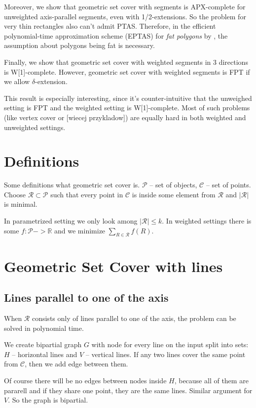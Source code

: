 \documentclass[en]{pracamgr}
\newcommand{\points}{\mathcal{C}}
\newcommand{\sets}{\mathcal{P}}
\newcommand{\sol}{\mathcal{R}}
\begin{document}
Moreover, we show that geometric set cover with segments
is APX-complete for unweighted axis-parallel segments,
even with 1/2-extensions.
So the problem for very thin rectangles
also can't admit PTAS.
Therefore, in the efficient polynomial-time approximation scheme (EPTAS)
for \textit{fat polygons} by \cite{harpeled12},
the assumption about polygons being fat is necessary. 

Finally, we show that geometric set cover with weighted segments in
3 directions is W[1]-complete.
However, geometric set cover with weighted segments is FPT if we allow
$\delta$-extension.

This result is especially interesting,
since it's counter-intuitive that
the unweighed setting is FPT and the weighted
setting is W[1]-complete.
Most of such problems (like vertex cover or [wiecej przykladow])
are equally hard in both weighted and unweighted settings.

\chapter{Definitions}
Some definitions what geometric set cover is.
$\sets$ -- set of objects, $\points$ -- set of points.
Choose $\sol \subset \sets$ such that
every point in $\points$ is inside some element from $\sol$
and $|\sol|$ is minimal.

In parametrized setting we only look among $|\sol| \le k$.
In weighted settings there is some $f : \sets -> \mathbb{R}$
and we minimize $\sum_{R \in \sol} f(R)$.





\chapter{Geometric Set Cover with lines}
\section{Lines parallel to one of the axis}
When $\mathcal{R}$ consists only of lines parallel to
one of the axis, the problem can be solved in
polynomial time.

We create bipartial graph $G$ with node for every line on the input
split into sets: $H$ -- horizontal lines and $V$ -- vertical lines.
If any two lines cover the same point from $\mathcal{C}$, then
we add edge between them.

Of course there will be no edges between nodes inside $H$,
because all of them are pararell and if they share 
one point, they are the same lines. Similar argument for $V$.
So the graph is bipartial.
\end{document}
